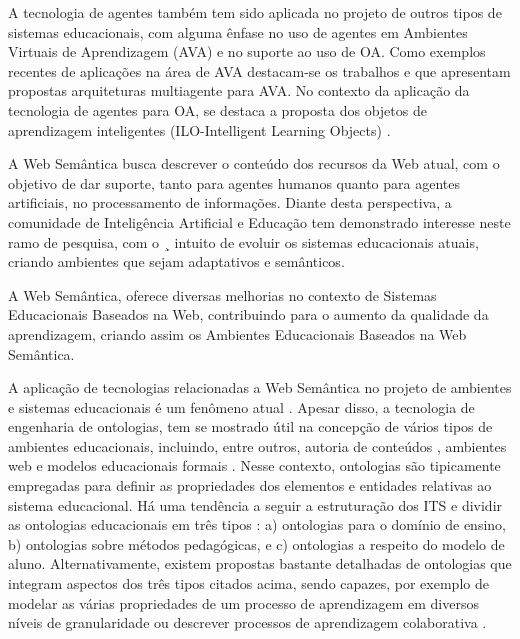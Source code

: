 \documentclass[12pt,journal,compsoc]{IEEEtran}
\begin{document}
A tecnologia de agentes também tem sido aplicada no projeto de outros tipos de sistemas educacionais, 
com alguma ênfase no uso de agentes em Ambientes Virtuais de Aprendizagem (AVA) e no suporte ao uso de OA. 
Como exemplos recentes de aplicações na área de AVA destacam-se os trabalhos \cite{Arias}  e \cite{Campana2008} que 
apresentam propostas arquiteturas multiagente para AVA. No contexto da aplicação da tecnologia de agentes para OA, 
se destaca a proposta dos objetos de aprendizagem inteligentes 
(ILO-Intelligent Learning Objects) \cite{Gomes2004} \cite{Bavaresco2009}.

A Web Semântica busca descrever o conteúdo dos recursos da Web atual, com o objetivo de dar suporte, 
tanto para agentes humanos quanto para agentes artificiais, no processamento de informações. 
Diante desta perspectiva, a comunidade de Inteligência Artificial e Educação tem demonstrado 
interesse neste ramo de pesquisa, com o ¸ intuito de evoluir os sistemas educacionais atuais,
criando ambientes que sejam adaptativos e semânticos.

A Web Semântica, oferece diversas melhorias no contexto de Sistemas Educacionais Baseados na Web, 
contribuindo para o aumento da qualidade da aprendizagem, criando assim os Ambientes Educacionais 
Baseados na Web Semântica.

A aplicação de tecnologias relacionadas a Web Semântica no projeto de ambientes e sistemas educacionais é um fenômeno atual \cite{Isotani} \cite{Proceedings2007}. Apesar disso, a tecnologia de engenharia de ontologias, 
tem se mostrado útil na concepção de vários tipos de ambientes educacionais, incluindo, entre outros, autoria 
de conteúdos \cite{Isotani} \cite{Isotani2008}, ambientes web \cite{Silva2009} \cite{Bittencourt2009} e 
modelos educacionais formais \cite{Hayashi2009}. Nesse contexto, ontologias são tipicamente empregadas para 
definir as propriedades dos elementos e entidades relativas ao sistema educacional. Há uma tendência a seguir 
a estruturação dos ITS e dividir as ontologias educacionais em três tipos \cite{Silva2009}: a) ontologias 
para o domínio de ensino, b) ontologias sobre métodos pedagógicas, e c) ontologias a respeito do modelo de aluno. 
Alternativamente, existem propostas bastante detalhadas de ontologias que integram aspectos dos três tipos citados acima, 
sendo capazes, por exemplo de modelar as várias propriedades de um processo de aprendizagem em diversos níveis de 
granularidade \cite{Proceedings2007} ou descrever processos de aprendizagem colaborativa \cite{Hayashi2009}.
\end{document}
